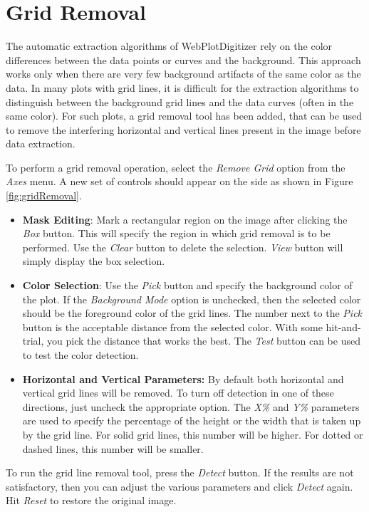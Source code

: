 \documentclass[letterpaper, 11pt]{article}
\begin{document}
\section{Grid Removal}
The automatic extraction algorithms of WebPlotDigitizer rely on the color differences between the data points or curves and the background. This approach works only when there are very few background artifacts of the same color as the data. In many plots with grid lines, it is difficult for the extraction algorithms to distinguish between the background grid lines and the data curves (often in the same color). For such plots, a grid removal tool has been added, that can be used to remove the interfering horizontal and vertical lines present in the image before data extraction.

To perform a grid removal operation, select the \emph{Remove Grid} option from the \emph{Axes} menu. A new set of controls should appear on the side as shown in Figure \ref{fig:gridRemoval}.
\begin{itemize}
\item{{\bf Mask Editing}: Mark a rectangular region on the image after clicking the \emph{Box} button. This will specify the region in which grid removal is to be performed. Use the \emph{Clear} button to delete the selection. \emph{View} button will simply display the box selection.}
\item{{\bf Color Selection}: Use the \emph{Pick} button and specify the background color of the plot. If the \emph{Background Mode} option is unchecked, then the selected color should be the foreground color of the grid lines. The number next to the \emph{Pick} button is the acceptable distance from the selected color. With some hit-and-trial, you pick the distance that works the best. The \emph{Test} button can be used to test the color detection.}
\item{{\bf Horizontal and Vertical Parameters:} By default both horizontal and vertical grid lines will be removed. To turn off detection in one of these directions, just uncheck the appropriate option. The \emph{X\%} and \emph{Y\%} parameters are used to specify the percentage of the height or the width that is taken up by the grid line. For solid grid lines, this number will be higher. For dotted or dashed lines, this number will be smaller.}
\end{itemize}

To run the grid line removal tool, press the \emph{Detect} button. If the results are not satisfactory, then you can adjust the various parameters and click \emph{Detect} again. Hit \emph{Reset} to restore the original image.
\end{document}
